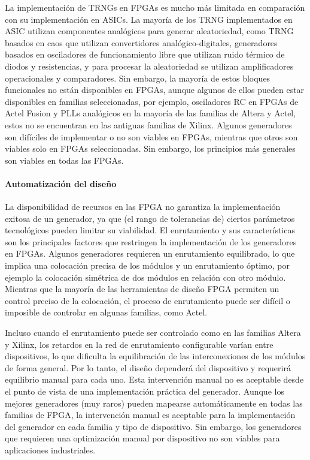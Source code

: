                 La implementación de TRNGs en FPGAs es mucho más limitada en comparación con su implementación en ASICs. La mayoría de los TRNG implementados en ASIC utilizan componentes analógicos para generar aleatoriedad, como TRNG basados en caos que utilizan convertidores analógico-digitales, generadores basados en osciladores de funcionamiento libre que utilizan ruido térmico de diodos y resistencias, y para procesar la aleatoriedad se utilizan amplificadores operacionales y comparadores. Sin embargo, la mayoría de estos bloques funcionales no están disponibles en FPGAs, aunque algunos de ellos pueden estar disponibles en familias seleccionadas, por ejemplo, osciladores RC en FPGAs de Actel Fusion y PLLs analógicos en la mayoría de las familias de Altera y Actel, estos no se encuentran en las antiguas familias de Xilinx. Algunos generadores son difíciles de implementar o no son viables en FPGAs, mientras que otros son viables solo en FPGAs seleccionadas. Sin embargo, los principios más generales son viables en todas las FPGAs.
				
	            \paragraph{Automatización del diseño\\}
				
                La disponibilidad de recursos en las FPGA no garantiza la implementación exitosa de un generador, ya que (el rango de tolerancias de) ciertos parámetros tecnológicos pueden limitar su viabilidad. El enrutamiento y sus características son los principales factores que restringen la implementación de los generadores en FPGAs. Algunos generadores requieren un enrutamiento equilibrado, lo que implica una colocación precisa de los módulos y un enrutamiento óptimo, por ejemplo la colocación simétrica de dos módulos en relación con otro módulo. Mientras que la mayoría de las herramientas de diseño FPGA permiten un control preciso de la colocación, el proceso de enrutamiento puede ser difícil o imposible de controlar en algunas familias, como Actel. 

                Incluso cuando el enrutamiento puede ser controlado como en las familias Altera y Xilinx, los retardos en la red de enrutamiento configurable varían entre dispositivos, lo que dificulta la equilibración de las interconexiones de los módulos de forma general. Por lo tanto, el diseño dependerá del dispositivo y requerirá equilibrio manual para cada uno. Esta intervención manual no es aceptable desde el punto de vista de una implementación práctica del generador. Aunque los mejores generadores (muy raros) pueden mapearse automáticamente en todas las familias de FPGA, la intervención manual es aceptable para la implementación del generador en cada familia y tipo de dispositivo. Sin embargo, los generadores que requieren una optimización manual por dispositivo no son viables para aplicaciones industriales.

